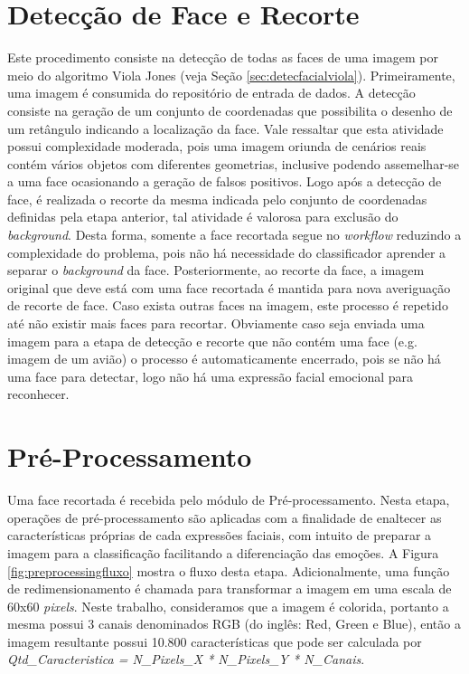 \section{Detecção de Face e Recorte}\label{sec:detect}
Este procedimento consiste na detecção de todas as faces de uma imagem por meio do algoritmo Viola Jones (veja Seção \ref{sec:detecfacialviola}). Primeiramente, uma imagem é consumida do repositório de entrada de dados. A detecção consiste na geração de um conjunto de coordenadas que possibilita o desenho de um retângulo indicando a localização da face. Vale ressaltar que esta atividade possui complexidade moderada, pois uma imagem oriunda de cenários reais contém vários objetos com diferentes geometrias, inclusive podendo assemelhar-se a uma face ocasionando a geração de falsos positivos. Logo após a detecção de face, é realizada o recorte da mesma indicada pelo conjunto de coordenadas definidas pela etapa anterior, tal atividade é valorosa para exclusão do \textit{background}. Desta forma, somente a face recortada segue no \textit{workflow} reduzindo a complexidade do problema, pois não há necessidade do classificador aprender a separar o \textit{background} da face. Posteriormente, ao recorte da face, a imagem original que deve está com uma face recortada é mantida para nova averiguação de recorte de face. Caso exista outras faces na imagem, este processo é repetido até não existir mais faces para recortar. Obviamente caso seja enviada uma imagem para a etapa de detecção e recorte que não contém uma face (e.g. imagem de um avião) o processo é automaticamente encerrado, pois se não há uma face para detectar, logo não há uma expressão facial emocional para reconhecer. 

\section{Pré-Processamento}\label{sec:preproc}
Uma face recortada é recebida pelo módulo de Pré-processamento. Nesta etapa, operações de pré-processamento são aplicadas com a finalidade de enaltecer as características próprias de cada expressões faciais, com intuito de preparar a imagem para a classificação facilitando a diferenciação das emoções. A Figura \ref{fig:preprocessingfluxo} mostra o fluxo desta etapa. Adicionalmente, uma função de redimensionamento é chamada para transformar a imagem em uma escala de 60x60 \textit{pixels}. Neste trabalho, consideramos que a imagem é colorida, portanto a mesma possui 3 canais denominados RGB (do inglês: Red, Green e Blue), então a imagem resultante possui 10.800 características que pode ser calculada por \textit{Qtd_Caracteristica = N_Pixels_X * N_Pixels_Y * N_Canais}. 

